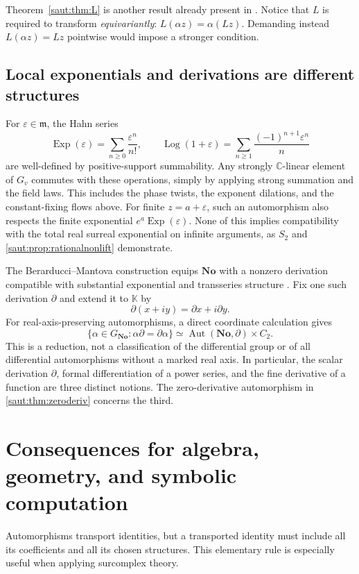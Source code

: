 \documentclass[11pt]{article}
\theoremstyle{definition}
\theoremstyle{remark}
\newcommand{\No}{\mathbf{No}}
\newcommand{\C}{\mathbb C}
\newcommand{\K}{\mathbb K}
\newcommand{\mm}{\mathfrak m}
\newcommand{\Aut}{\operatorname{Aut}}
\numberwithin{equation}{section}
\begin{document}
Theorem~\ref{saut:thm:L} is another result already present in
\cite{RepoRigidity}. Notice that $L$ is required to transform
\emph{equivariantly}: $L(\alpha z)=\alpha(Lz)$. Demanding instead
$L(\alpha z)=Lz$ pointwise would impose a stronger condition.

\subsection{Local exponentials and derivations are different structures}

For $\varepsilon\in\mm$, the Hahn series
\[
 \operatorname{Exp}(\varepsilon)=\sum_{n\ge0}\frac{\varepsilon^n}{n!},
 \qquad
 \operatorname{Log}(1+\varepsilon)
   =\sum_{n\ge1}\frac{(-1)^{n+1}\varepsilon^n}{n}
\]
are well-defined by positive-support summability. Any strongly
$\C$-linear element of $G_v$ commutes with these operations, simply by
applying strong summation and the field laws. This includes the phase
twists, the exponent dilations, and the constant-fixing flows above.
For finite $z=a+\varepsilon$, such an automorphism also respects the
finite exponential $e^a\operatorname{Exp}(\varepsilon)$.
None of this implies compatibility with the total real surreal exponential
on infinite arguments, as $S_2$ and \cref{saut:prop:rationalnonlift} demonstrate.

The Berarducci--Mantova construction equips $\No$ with a nonzero derivation
compatible with substantial exponential and transseries structure
\cite{BM}. Fix one such derivation $\partial$ and extend it to $\K$ by
\[
 \partial(x+iy)=\partial x+i\partial y.
\]
For real-axis-preserving automorphisms, a direct coordinate calculation gives
\[
 \{\alpha\in G_{\No}:\alpha\partial=\partial\alpha\}
 \simeq\Aut(\No,\partial)\times C_2.
\]
This is a reduction, not a classification of the differential group or of
all differential automorphisms without a marked real axis. In particular,
the scalar derivation $\partial$, formal differentiation of a power series,
and the fine derivative of a function are three distinct notions. The
zero-derivative automorphism in \cref{saut:thm:zeroderiv} concerns the third.

\section{Consequences for algebra, geometry, and symbolic computation}\label{saut:sec:applications}

Automorphisms transport identities, but a transported identity must include
all its coefficients and all its chosen structures. This elementary rule is
especially useful when applying surcomplex theory.
\end{document}
